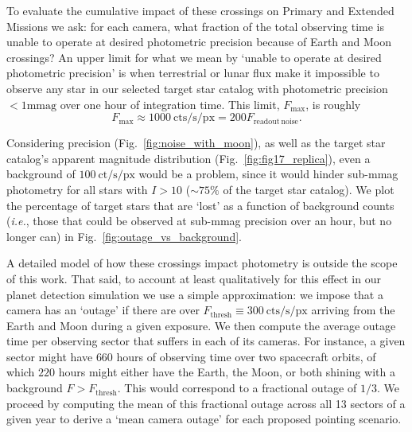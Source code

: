 To evaluate the cumulative impact of these crossings on \tesss Primary and Extended Missions we ask: for each camera, what fraction of the total observing time is \tess unable to operate at desired photometric precision because of Earth and Moon crossings?
An upper limit for what we mean by `unable to operate at desired photometric precision' is when terrestrial or lunar flux make it impossible to observe any star in our selected target star catalog with photometric precision $<1 \text{mmag}$ over one hour of integration time.
This limit, $F_\text{max}$, is roughly
\begin{equation*}
 F_\mathrm{max} \approx 1000\mathrm{\ cts/s/px} = 200 F_\mathrm{readout\ noise}.
\end{equation*}

Considering \tesss precision (Fig.~\ref{fig:noise_with_moon}), as well as the target star catalog's apparent magnitude distribution (Fig.~\ref{fig:fig17_replica}), even a background of $100\ \text{ct/s/px}$ would be a problem, since it would hinder sub-mmag photometry for all stars with $I > 10$ ($\sim75\%$ of the target star catalog). We plot the percentage of target stars that are `lost' as a function of background counts (\textit{i.e.}, those that could be observed at sub-mmag precision over an hour, but no longer can) in Fig.~\ref{fig:outage_vs_background}.

A detailed model of how these crossings impact \tess photometry is outside the scope of this work.
That said, to account at least qualitatively for this effect in our planet detection simulation we use a simple approximation: we impose that a camera has an `outage' if there are over $F_\text{thresh}\equiv300\ \text{cts/s/px}$ arriving from the Earth and Moon during a given exposure.
We then compute the average outage time per observing sector that \tess suffers in each of its cameras. 
For instance, a given sector might have $660$ hours of observing time over two spacecraft orbits, of which $220$ hours might either have the Earth, the Moon, or both shining with a background $F > F_\text{thresh}$. 
This would correspond to a fractional outage of $1/3$. 
We proceed by computing the mean of this fractional outage across all 13 sectors of a given year to derive a `mean camera outage' for each proposed pointing scenario.


